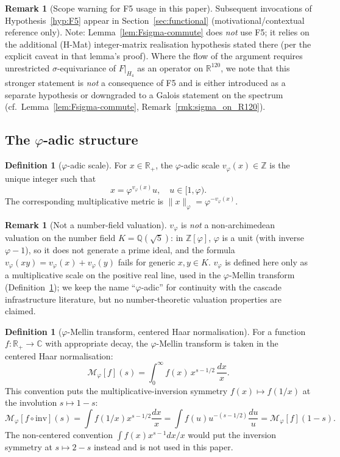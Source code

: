 \documentclass[11pt, a4paper]{amsart}
\theoremstyle{definition}
\newtheorem{definition}[theorem]{Definition}
\newtheorem{remark}[theorem]{Remark}
\newcommand{\R}{\mathbb{R}}
\newcommand{\Z}{\mathbb{Z}}
\newcommand{\Q}{\mathbb{Q}}
\newcommand{\C}{\mathbb{C}}
\newcommand{\pphi}{\varphi}
\begin{document}
\begin{remark}[Scope warning for F5 usage in this paper]\label{rmk:F5_scope}
Subsequent invocations of Hypothesis~\ref{hyp:F5} appear in
Section~\ref{sec:functional} (motivational/contextual reference
only).  Note: Lemma~\ref{lem:Fsigma-commute} does \emph{not} use
F5; it relies on the additional (H-Mat) integer-matrix
realisation hypothesis stated there (per the explicit caveat in
that lemma's proof).  Where the flow of the argument requires
unrestricted $\sigma$-equivariance of $F|_{H_4}$ as an operator on
$\R^{120}$, we note that this stronger statement is \emph{not} a
consequence of F5 and is either introduced as a separate
hypothesis or downgraded to a Galois statement on the spectrum
(cf.\ Lemma~\ref{lem:Fsigma-commute},
Remark~\ref{rmk:sigma_on_R120}).
\end{remark}

\subsection{The $\pphi$-adic structure}

\begin{definition}[$\pphi$-adic scale]\label{def:valuation}
For $x \in \R_+$, the $\pphi$-adic scale $v_\pphi(x) \in \Z$ is the
unique integer such that
\[
x = \pphi^{v_\pphi(x)} u, \quad u \in [1, \pphi).
\]
The corresponding multiplicative metric is
$\|x\|_\pphi = \pphi^{-v_\pphi(x)}$.
\end{definition}

\begin{remark}[Not a number-field valuation]\label{rmk:phi_not_valuation}
$v_\pphi$ is \emph{not} a non-archimedean valuation on the number
field $K = \Q(\sqrt 5)$: in $\Z[\pphi]$, $\pphi$ is a unit (with
inverse $\pphi - 1$), so it does not generate a prime ideal, and
the formula $v_\pphi(xy) = v_\pphi(x) + v_\pphi(y)$ fails for
generic $x, y \in K$.  $v_\pphi$ is defined here only as a
multiplicative scale on the positive real line, used in the
$\pphi$-Mellin transform (Definition~\ref{def:mellin}); we keep
the name ``$\pphi$-adic'' for continuity with the cascade
infrastructure literature, but no number-theoretic valuation
properties are claimed.
\end{remark}

\begin{definition}[$\pphi$-Mellin transform, centered Haar normalisation]\label{def:mellin}
For a function $f: \R_+ \to \C$ with appropriate decay, the
$\pphi$-Mellin transform is taken in the centered Haar
normalisation:
\[
\mathcal{M}_\pphi[f](s) = \int_0^\infty f(x)\, x^{s-1/2}\, \frac{dx}{x}.
\]
This convention puts the multiplicative-inversion symmetry
$f(x) \mapsto f(1/x)$ at the involution $s \mapsto 1 - s$:
\[
\mathcal{M}_\pphi[f \circ \mathrm{inv}](s)
= \int f(1/x) x^{s - 1/2} \frac{dx}{x}
= \int f(u) u^{-(s-1/2)} \frac{du}{u}
= \mathcal{M}_\pphi[f](1 - s).
\]
The non-centered convention $\int f(x) x^{s-1} dx/x$ would put the
inversion symmetry at $s \mapsto 2 - s$ instead and is not used
in this paper.
\end{definition}
\end{document}
